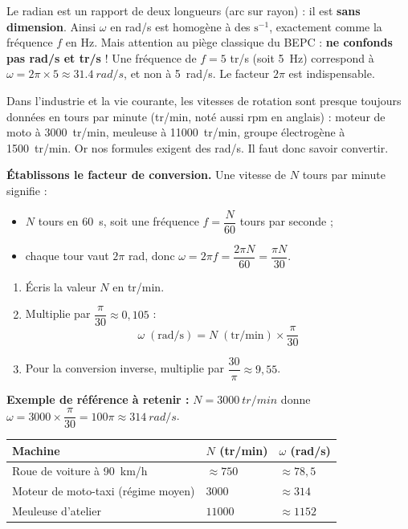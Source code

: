 \documentclass[11pt]{article}
\newcommand{\cle}[1]{{\popxbold\color{popdark}#1}}
\newcounter{popsec}
\newcounter{popsub}
\newcommand{\courssub}[1]{%
  \stepcounter{popsub}%
  \par\vspace{9pt}\noindent{\popxbold\fontsize{11.5}{13}\selectfont\color{popink}{\color{poporange}\thepopsec.\thepopsub}\hspace{6pt}#1}\par\nopagebreak\vspace{4pt}
}
\begin{document}
\begin{attention}
Le radian est un rapport de deux longueurs (arc sur rayon) : il est \textbf{sans dimension}. Ainsi $\omega$ en rad/s est homogène à des $\text{s}^{-1}$, exactement comme la fréquence $f$ en Hz. Mais attention au piège classique du BEPC : \textbf{ne confonds pas rad/s et tr/s} ! Une fréquence de $f = 5$ tr/s (soit \SI{5}{Hz}) correspond à $\omega = 2\pi \times 5 \approx \SI{31,4}{rad/s}$, et non à \SI{5}{rad/s}. Le facteur $2\pi$ est indispensable.
\end{attention}

\courssub{Conversion tr/min $\leftrightarrow$ rad/s}

Dans l'industrie et la vie courante, les vitesses de rotation sont presque toujours données en \cle{tours par minute} (tr/min, noté aussi rpm en anglais) : moteur de moto à \SI{3000}{tr/min}, meuleuse à \SI{11000}{tr/min}, groupe électrogène à \SI{1500}{tr/min}. Or nos formules exigent des rad/s. Il faut donc savoir convertir.

\textbf{Établissons le facteur de conversion.} Une vitesse de $N$ tours par minute signifie :
\begin{itemize}
\item $N$ tours en \SI{60}{s}, soit une fréquence $f = \dfrac{N}{60}$ tours par seconde ;
\item chaque tour vaut $2\pi$ rad, donc $\omega = 2\pi f = \dfrac{2\pi N}{60} = \dfrac{\pi N}{30}$.
\end{itemize}

\begin{methode}
\begin{enumerate}
\item Écris la valeur $N$ en tr/min.
\item Multiplie par $\dfrac{\pi}{30} \approx 0{,}105$ :
\[ \omega \;(\text{rad/s}) = N \;(\text{tr/min}) \times \dfrac{\pi}{30} \]
\item Pour la conversion inverse, multiplie par $\dfrac{30}{\pi} \approx 9{,}55$.
\end{enumerate}
\textbf{Exemple de référence à retenir :} $N = \SI{3000}{tr/min}$ donne $\omega = 3000 \times \dfrac{\pi}{30} = 100\pi \approx \SI{314}{rad/s}$.
\end{methode}

\begin{exemplebox}
\begin{center}
\begin{tabularx}{\linewidth}{|l|X|X|}\hline
\rowcolor{popblueL} \textbf{Machine} & \textbf{$N$ (tr/min)} & \textbf{$\omega$ (rad/s)} \\ \hline
Roue de voiture à \SI{90}{km/h} & $\approx 750$ & $\approx 78{,}5$ \\ \hline
Moteur de moto-taxi (régime moyen) & $3000$ & $\approx 314$ \\ \hline
Meuleuse d'atelier & $11000$ & $\approx 1152$ \\ \hline
\end{tabularx}
\end{center}
\end{exemplebox}
\end{document}
